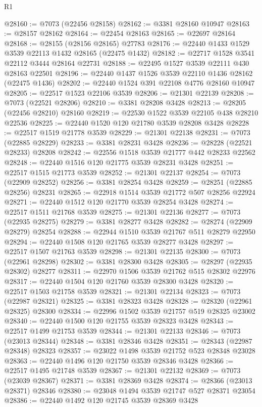 \begin{lexlean}{R1}
\begin{coremodule}
@28160 := @7073 (@22456 @28158)
@28162 := @3381 @28160 @10947
@28163 := @28157 @28162
@28164 := @22454 @28163
@28165 := @22697 @28164
@28168 := @28155 (@28156 @28165) @27783
@28176 := @22440 @1433 @1529 @3539 @22113 @1432 @28165 (@22475 @1432)
@28182 := @22717 @1528 @3541 @22112 @3444 @28164 @22731
@28188 := @22495 @1527 @3539 @22111 @430 @28163 @22501
@28196 := @22440 @1437 @1526 @3539 @22110 @1436 @28162 (@22475 @1436)
@28202 := @22440 @1524 @391 @22108 @4776 @28160 @10947
@28205 := @22517 @1523 @22106 @3539
@28206 := @21301 @22139
@28208 := @7073 (@22521 @28206)
@28210 := @3381 @28208 @3428
@28213 := @28205 (@22456 @28210) @28160
@28219 := @22530 @1522 @3539 @22105 @438 @28210 @22536
@28225 := @22440 @1520 @120 @21780 @3539 @28208 @3428
@28228 := @22517 @1519 @21778 @3539
@28229 := @21301 @22138
@28231 := @7073 (@22885 @28229)
@28233 := @3381 @28231 @3428
@28236 := @28228 (@22521 @28233) @28208
@28242 := @22556 @1518 @3539 @21777 @442 @28233 @22562
@28248 := @22440 @1516 @120 @21775 @3539 @28231 @3428
@28251 := @22517 @1515 @21773 @3539
@28252 := @21301 @22137
@28254 := @7073 (@22909 @28252)
@28256 := @3381 @28254 @3428
@28259 := @28251 (@22885 @28256) @28231
@28265 := @22918 @1514 @3539 @21772 @507 @28256 @22924
@28271 := @22440 @1512 @120 @21770 @3539 @28254 @3428
@28274 := @22517 @1511 @21768 @3539
@28275 := @21301 @22136
@28277 := @7073 (@22935 @28275)
@28279 := @3381 @28277 @3428
@28282 := @28274 (@22909 @28279) @28254
@28288 := @22944 @1510 @3539 @21767 @511 @28279 @22950
@28294 := @22440 @1508 @120 @21765 @3539 @28277 @3428
@28297 := @22517 @1507 @21763 @3539
@28298 := @21301 @22135
@28300 := @7073 (@22961 @28298)
@28302 := @3381 @28300 @3428
@28305 := @28297 (@22935 @28302) @28277
@28311 := @22970 @1506 @3539 @21762 @515 @28302 @22976
@28317 := @22440 @1504 @120 @21760 @3539 @28300 @3428
@28320 := @22517 @1503 @21758 @3539
@28321 := @21301 @22134
@28323 := @7073 (@22987 @28321)
@28325 := @3381 @28323 @3428
@28328 := @28320 (@22961 @28325) @28300
@28334 := @22996 @1502 @3539 @21757 @519 @28325 @23002
@28340 := @22440 @1500 @120 @21755 @3539 @28323 @3428
@28343 := @22517 @1499 @21753 @3539
@28344 := @21301 @22133
@28346 := @7073 (@23013 @28344)
@28348 := @3381 @28346 @3428
@28351 := @28343 (@22987 @28348) @28323
@28357 := @23022 @1498 @3539 @21752 @523 @28348 @23028
@28363 := @22440 @1496 @120 @21750 @3539 @28346 @3428
@28366 := @22517 @1495 @21748 @3539
@28367 := @21301 @22132
@28369 := @7073 (@23039 @28367)
@28371 := @3381 @28369 @3428
@28374 := @28366 (@23013 @28371) @28346
@28380 := @23048 @1494 @3539 @21747 @527 @28371 @23054
@28386 := @22440 @1492 @120 @21745 @3539 @28369 @3428

\end{coremodule}
\end{lexlean}
